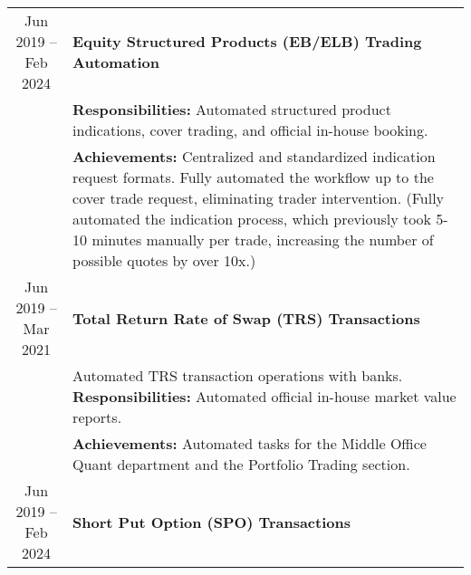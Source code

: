 \documentclass[uplatex,a4j,10.5pt,dvipdfmx]{jsarticle}
\begin{document}
\begin{longtable}{|c|p{14cm}|}
	\hline
	Jun 2019 -- Feb 2024                  & \textbf{\textbullet{} Equity Structured Products (EB/ELB) Trading Automation}                                                                                                                                                                                                                                                                \\
	                                      & {\small \textbf{Responsibilities:}} Automated structured product indications, cover trading, and official in-house booking.                                                                                                                                                                                                                  \\
	                                      & {\small \textbf{Achievements:}} Centralized and standardized indication request formats. Fully automated the workflow up to the cover trade request, eliminating trader intervention. (Fully automated the indication process, which previously took 5-10 minutes manually per trade, increasing the number of possible quotes by over 10x.) \\
	\hline
	Jun 2019 -- Mar 2021                  & \textbf{\textbullet{} Total Return Rate of Swap (TRS) Transactions}                                                                                                                                                                                                                                                                          \\
	                                      & Automated TRS transaction operations with banks. {\small \textbf{Responsibilities:}} Automated official in-house market value reports.                                                                                                                                                                                                       \\
	                                      & {\small \textbf{Achievements:}} Automated tasks for the Middle Office Quant department and the Portfolio Trading section.                                                                                                                                                                                                                    \\
	\hline
	Jun 2019 -- Feb 2024                  & \textbf{\textbullet{} Short Put Option (SPO) Transactions}                                                                                                                                                                                                                                                                                   \\

\end{longtable}
\end{document}
